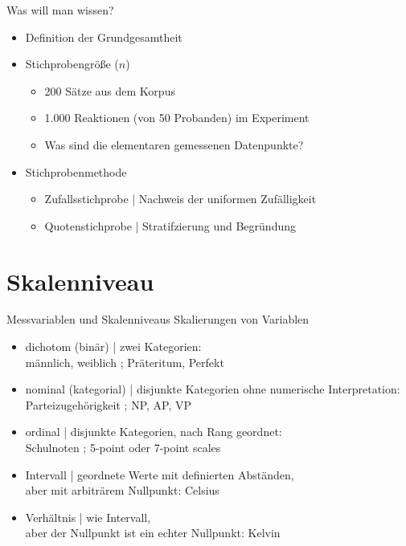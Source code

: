 \begin{frame}
  {Was will man wissen?}
  \begin{itemize}[<+->]
    \item Definition der Grundgesamtheit
      \Halbzeile
    \item \alert{Stichprobengröße ($n$)}
      \begin{itemize}[<+->]
        \item 200 Sätze aus dem Korpus
        \item 1.000 Reaktionen (von 50 Probanden) im Experiment
        \item Was sind die elementaren gemessenen Datenpunkte?
      \end{itemize}
      \Halbzeile
    \item Stichprobenmethode
      \begin{itemize}[<+->]
        \item \alert{Zufallsstichprobe} | Nachweis der uniformen Zufälligkeit
        \item \alert{Quotenstichprobe} | Stratifzierung und Begründung
      \end{itemize}
  \end{itemize}
\end{frame}


\section{Skalenniveau}

\begin{frame}
  {Messvariablen und Skalenniveaus}
  \alert{Skalierungen} von Variablen\\
  \Halbzeile
  \begin{itemize}[<+->]
    \item \alert{dichotom} (binär) | zwei Kategorien:\\
      männlich, weiblich ; Präteritum, Perfekt
      \Viertelzeile
    \item \alert{nominal} (kategorial) | disjunkte Kategorien ohne numerische Interpretation:\\
      Parteizugehörigkeit ; NP, AP, VP
      \Viertelzeile
    \item \alert{ordinal} | disjunkte Kategorien, nach Rang geordnet:\\
      Schulnoten ; 5-point oder 7-point scales\\
      \Viertelzeile
    \item \alert{Intervall} | geordnete Werte mit definierten Abständen,\\
      aber mit arbiträrem Nullpunkt: Celsius
      \Viertelzeile
    \item \alert{Verhältnis} | wie Intervall,\\
      aber der Nullpunkt ist ein echter Nullpunkt: Kelvin
  \end{itemize}
\end{frame}

